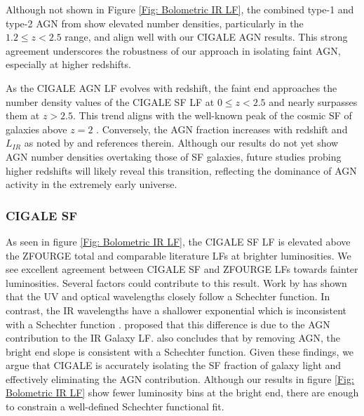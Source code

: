 Although not shown in Figure \ref{Fig: Bolometric IR LF}, the combined type-1 and type-2 AGN from \cite{symeonidis_agn_2021} show elevated number densities, particularly in the $1.2 \leq z < 2.5$ range, and align well with our CIGALE AGN results. This strong agreement underscores the robustness of our approach in isolating faint AGN, especially at higher redshifts.

As the CIGALE AGN LF evolves with redshift, the faint end approaches the number density values of the CIGALE SF LF at $0 \leq z < 2.5$ and nearly surpasses them at $z > 2.5$. This trend aligns with the well-known peak of the cosmic SF of galaxies above $z=2$ \citep{wu_mid-infrared_2011}. Conversely, the AGN fraction increases with redshift and $L_{IR}$ as noted by \cite{symeonidis_agn_2021, thorne_deep_2022} and references therein. Although our results do not yet show AGN number densities overtaking those of SF galaxies, future studies probing higher redshifts will likely reveal this transition, reflecting the dominance of AGN activity in the extremely early universe.

\subsubsection{CIGALE SF}
As seen in figure \ref{Fig: Bolometric IR LF}, the CIGALE SF LF is elevated above the ZFOURGE total and comparable literature LFs at brighter luminosities. We see excellent agreement between CIGALE SF and ZFOURGE LFs towards fainter luminosities. Several factors could contribute to this result. Work by \cite{wu_mid-infrared_2011} has shown that the UV and optical wavelengths closely follow a Schechter function. In contrast, the IR wavelengths have a shallower exponential which is inconsistent with a Schechter function \citep{symeonidis_what_2019}. \cite{fu_decomposing_2010} proposed that this difference is due to the AGN contribution to the IR Galaxy LF. \cite{wu_mid-infrared_2011} also concludes that by removing AGN, the bright end slope is consistent with a Schechter function. Given these findings, we argue that CIGALE is accurately isolating the SF fraction of galaxy light and effectively eliminating the AGN contribution. Although our results in figure \ref{Fig: Bolometric IR LF} show fewer luminosity bins at the bright end, there are enough to constrain a well-defined Schechter functional fit.

